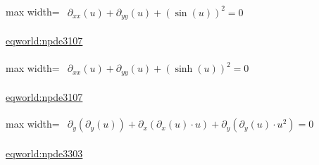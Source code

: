 \documentclass[UTF8,10pt,a4paper,fontset=mac]{ctexart}
\begin{document}
\begin{minipage}{\linewidth}\begin{center}\begin{adjustbox}{max width=\linewidth}$\displaystyle\begin{gathered}\begin{gathered}\partial_{xx}(u)+\partial_{yy}(u)+(\sin(u))^{2}=0\end{gathered}\end{gathered}$\end{adjustbox}\end{center}{\small\href{https://eqworld.ipmnet.ru/en/solutions/npde/npde3107.pdf}{eqworld:npde3107}}\par\end{minipage}\par\vspace{6mm}

\begin{minipage}{\linewidth}\begin{center}\begin{adjustbox}{max width=\linewidth}$\displaystyle\begin{gathered}\begin{gathered}\partial_{xx}(u)+\partial_{yy}(u)+(\sinh(u))^{2}=0\end{gathered}\end{gathered}$\end{adjustbox}\end{center}{\small\href{https://eqworld.ipmnet.ru/en/solutions/npde/npde3107.pdf}{eqworld:npde3107}}\par\end{minipage}\par\vspace{6mm}

\begin{minipage}{\linewidth}\begin{center}\begin{adjustbox}{max width=\linewidth}$\displaystyle\begin{gathered}\begin{gathered}\partial_{y}(\partial_{y}(u))+\partial_{x}(\partial_{x}(u)\cdot u)+\partial_{y}(\partial_{y}(u)\cdot u^{2})=0\end{gathered}\end{gathered}$\end{adjustbox}\end{center}{\small\href{https://eqworld.ipmnet.ru/en/solutions/npde/npde3303.pdf}{eqworld:npde3303}}\par\end{minipage}\par\vspace{6mm}
\end{document}
